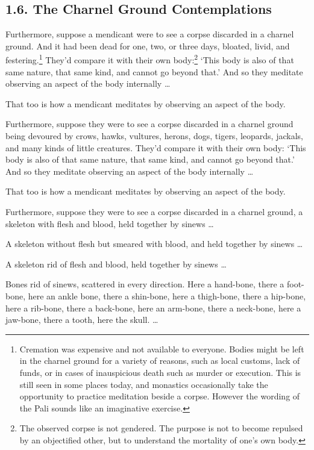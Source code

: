 \documentclass[12pt,openany]{book}%
\begin{document}
\subsection*{1.6. The Charnel Ground Contemplations }

Furthermore, suppose a mendicant were to see a corpse discarded in a charnel ground. And it had been dead for one, two, or three days, bloated, livid, and festering.\footnote{Cremation was expensive and not available to everyone. Bodies might be left in the charnel ground for a variety of reasons, such as local customs, lack of funds, or in cases of inauspicious death such as murder or execution. This is still seen in some places today, and monastics occasionally take the opportunity to practice meditation beside a corpse. However the wording of the Pali sounds like an imaginative exercise. } They’d compare it with their own body:\footnote{The observed corpse is not gendered. The purpose is not to become repulsed by an objectified other, but to understand the mortality of one’s own body. } ‘This body is also of that same nature, that same kind, and cannot go beyond that.’ And so they meditate observing an aspect of the body internally … 

That too is how a mendicant meditates by observing an aspect of the body. 

Furthermore, suppose they were to see a corpse discarded in a charnel ground being devoured by crows, hawks, vultures, herons, dogs, tigers, leopards, jackals, and many kinds of little creatures. They’d compare it with their own body: ‘This body is also of that same nature, that same kind, and cannot go beyond that.’ And so they meditate observing an aspect of the body internally … 

That too is how a mendicant meditates by observing an aspect of the body. 

Furthermore, suppose they were to see a corpse discarded in a charnel ground, a skeleton with flesh and blood, held together by sinews … 

A skeleton without flesh but smeared with blood, and held together by sinews … 

A skeleton rid of flesh and blood, held together by sinews … 

Bones rid of sinews, scattered in every direction. Here a hand-bone, there a foot-bone, here an ankle bone, there a shin-bone, here a thigh-bone, there a hip-bone, here a rib-bone, there a back-bone, here an arm-bone, there a neck-bone, here a jaw-bone, there a tooth, here the skull. … 
\end{document}
